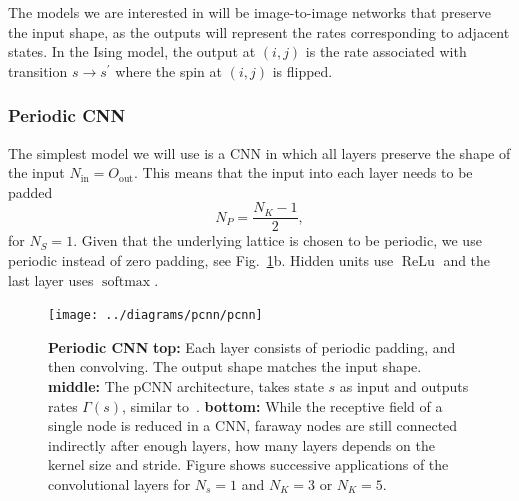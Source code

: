 The models we are interested in will be image-to-image networks that preserve the input shape, as the outputs will represent the rates corresponding to adjacent states. In the Ising model, the output at $(i, j)$ is the rate associated with transition $s \rightarrow s^\prime$ where the spin at $(i, j)$ is flipped.
\subsubsection{Periodic CNN}
The simplest model we will use is a CNN in which all layers preserve the shape of the input $N_\text{in} = O_\text{out}$. This means that the input into each layer needs to be padded
\begin{equation}
		N_{P} = \frac{N_{K}-1}{2},
\end{equation}
for $N_S = 1$. Given that the underlying lattice is chosen to be periodic, we use periodic instead of zero padding, see Fig.~\ref{fig:pcnn}b. Hidden units use $\operatorname{ReLu}$ and the last layer uses $\operatorname{softmax}$. 
\begin{figure}[H]
	\centering
	\texttt{[image: ../diagrams/pcnn/pcnn]}
	\caption[Periodic CNN]{\textbf{Periodic CNN} \textbf{top:} Each layer consists of periodic padding, and then convolving. The output shape matches the input shape. \textbf{middle:} The pCNN architecture, takes state $s$ as input and outputs rates $\Gamma(s)$, similar to~\cite{gispen2020ground}. \textbf{bottom: } While the receptive field of a single node is reduced in a CNN, faraway nodes are still connected indirectly after enough layers, how many layers depends on the kernel size and stride. Figure shows successive applications of the convolutional layers for $N_s=1$ and $N_K = 3$ or $N_K=5$. }
	\label{fig:pcnn}
\end{figure}
